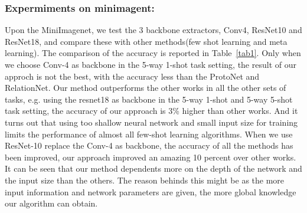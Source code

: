 \documentclass[runningheads]{llncs}
\begin{document}
\subsubsection{Expermiments on minimagent:}
Upon the MiniImagenet, we test the 3 backbone extractors, Conv4, ResNet10 and ResNet18, and compare these with other methods(few shot learning and meta learning). The comparison of the accuracy is reported in Table~\ref{tab1}. Only when we choose Conv-4 as backbone in the 5-way 1-shot task setting, the result of our approch is not the best, with the accuracy less than the ProtoNet and RelationNet. Our method outperforms the other works in all the other sets of tasks, e.g. using the resnet18 as backbone in the 5-way 1-shot and 5-way 5-shot task setting, the accuracy of our approach is 3\% higher than other works. And it turns out that using too shallow neural network and small input size for training limits the performance of almost all few-shot learning algorithms. When we use ResNet-10 replace the Conv-4 as backbone, the accuracy of all the methods has been improved, our approach improved an amazing 10 percent over other works. It can be seen that our method dependents more on the depth of the network and the input size than the others. The reason behinds this might be as the more input information and network parameters are given, the more global knowledge our algorithm can obtain.
\end{document}
